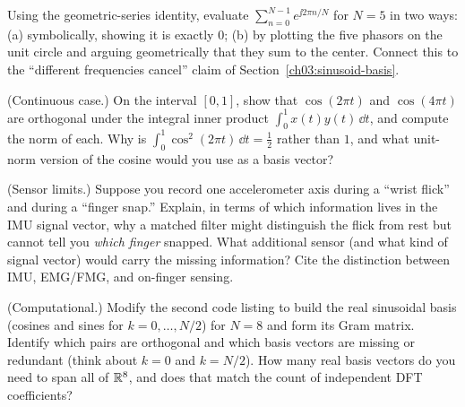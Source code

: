 \begin{exercise}
Using the geometric-series identity, evaluate $\sum_{n=0}^{N-1} e^{\jj 2\pi n/N}$ for $N=5$ in two
ways: (a) symbolically, showing it is exactly $0$; (b) by plotting the five phasors on the unit
circle and arguing geometrically that they sum to the center. Connect this to the ``different
frequencies cancel'' claim of Section~\ref{ch03:sinusoid-basis}.
\end{exercise}

\begin{exercise}
(Continuous case.) On the interval $[0,1]$, show that $\cos(2\pi t)$ and $\cos(4\pi t)$ are
orthogonal under the integral inner product $\int_0^1 x(t)y(t)\,\dd t$, and compute the norm of each.
Why is $\int_0^1 \cos^2(2\pi t)\,\dd t = \tfrac12$ rather than $1$, and what unit-norm version of the
cosine would you use as a basis vector?
\end{exercise}

\begin{exercise}
(Sensor limits.) Suppose you record one accelerometer axis during a ``wrist flick'' and during a
``finger snap.'' Explain, in terms of which information lives in the IMU signal vector, why a matched
filter might distinguish the flick from rest but cannot tell you \emph{which finger} snapped. What
additional sensor (and what kind of signal vector) would carry the missing information? Cite the
distinction between IMU, EMG/FMG, and on-finger sensing.
\end{exercise}

\begin{exercise}
(Computational.) Modify the second code listing to build the real sinusoidal basis (cosines and sines
for $k=0,\dots,N/2$) for $N=8$ and form its Gram matrix. Identify which pairs are orthogonal and
which basis vectors are missing or redundant (think about $k=0$ and $k=N/2$). How many real basis
vectors do you need to span all of $\mathbb{R}^8$, and does that match the count of independent DFT
coefficients?
\end{exercise}
